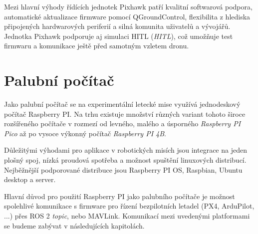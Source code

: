 Mezi hlavní výhody řídících jednotek Pixhawk patří kvalitní softwarová podpora, automatické aktualizace firmware pomocí QGroundControl, flexibilita z hlediska připojených hardwarových periferií a silná komunita uživatelů a vývojářů. Jednotka Pixhawk podporuje aj simulaci \acs{HITL} (\textit{\acl{HITL}}), což umožňuje test firmwaru a komunikace ještě před samotným vzletem dronu.

\section{Palubní počítač}

Jako palubní počítač se na experimentální letecké mise využívá jednodeskový počítač Raspberry PI. Na trhu existuje množství různých variant tohoto široce rozšířeného počítače v rozmezí od levného, malého a úsporného  \textit{Raspberry PI Pico} až po vysoce výkonný počítač \textit{Raspberry PI 4B}.

Důležitými výhodami pro aplikace v robotických misích jsou integrace na jeden plošný spoj, nízká proudová spotřeba a možnost spuštění linuxových distribucí. Nejběžnější podporované distribuce jsou Raspberry PI OS, Raspbian, Ubuntu desktop a server.

Hlavní důvod pro použití Raspberry PI jako palubního počítače je možnost spolehlivé komunikace s firmware pro řízení bezpilotních letadel (PX4, ArduPilot, ...) přes ROS 2 \textit{topic}, nebo MAVLink. Komunikací mezi uvedenými platformami se budeme zabývat v následujících kapitolách.
